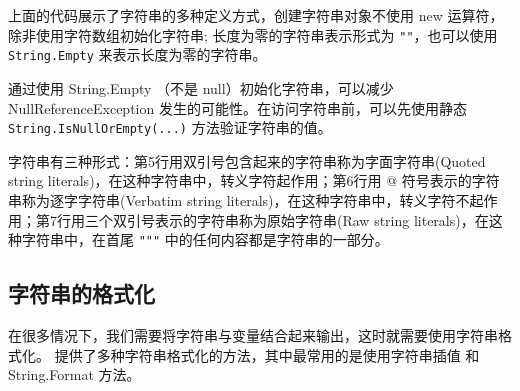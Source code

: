 上面的代码展示了字符串的多种定义方式，创建字符串对象不使用 new 运算符，除非使用字符数组初始化字符串; 长度为零的字符串表示形式为 \verb|""|，也可以使用 \verb|String.Empty| 来表示长度为零的字符串。

通过使用 String.Empty （不是 null）初始化字符串，可以减少 NullReferenceException 发生的可能性。在访问字符串前，可以先使用静态 \verb|String.IsNullOrEmpty(...)| 方法验证字符串的值。

字符串有三种形式：第5行用双引号包含起来的字符串称为字面字符串(Quoted string literals)，在这种字符串中，转义字符起作用；第6行用 @ 符号表示的字符串称为逐字字符串(Verbatim string literals)，在这种字符串中，转义字符不起作用；第7行用三个双引号表示的字符串称为原始字符串(Raw string literals)，在这种字符串中，在首尾 \verb|"""| 中的任何内容都是字符串的一部分。

\subsection{字符串的格式化}

在很多情况下，我们需要将字符串与变量结合起来输出，这时就需要使用字符串格式化。
\cs 提供了多种字符串格式化的方法，其中最常用的是使用字符串插值 和 String.Format 方法。


